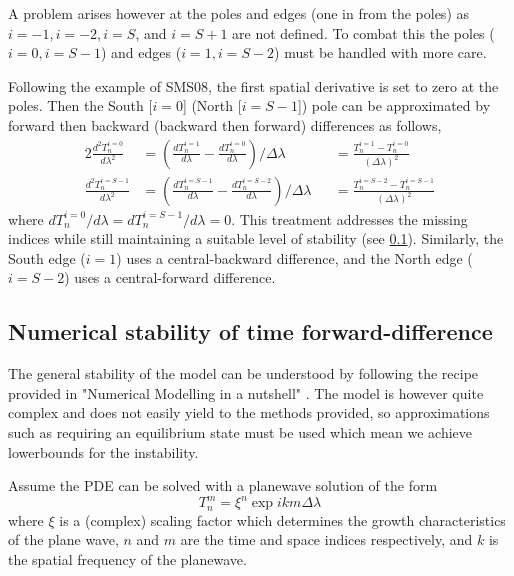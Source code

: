 \documentclass[12pt, onecolumn]{revtex4-2}    %
\begin{document}
A problem arises however at the poles and edges (one in from the poles) as $i=-1, i=-2, i=S$, and $i=S+1$ are not defined.
To combat this the poles ($i=0, i=S-1$) and edges ($i=1, i=S-2$) must be handled with more care.

Following the example of SMS08, the first spatial derivative is set to zero at the poles.
Then the South [$i=0$] (North [$i=S-1$]) pole can be approximated by forward then backward (backward then forward) differences as follows,
\begin{alignat}{2}
    \frac{d^2 T^{i=0}_n}{d \lambda ^2}   & = \left(\frac{dT^{i=1}_n}{d\lambda} - \frac{dT^{i=0}_n}{d\lambda}\right) / \Delta\lambda     &  & = \frac{T^{i=1}_n - T^{i=0}_n}{(\Delta\lambda)^2}
    \label{eq:forward_backward}                                                                                                                                                                    \\
    \frac{d^2 T^{i=S-1}_n}{d \lambda ^2} & = \left(\frac{dT^{i=S-1}_n}{d\lambda} - \frac{dT^{i=S-2}_n}{d\lambda}\right) / \Delta\lambda &  & = \frac{T^{i=S-2}_n - T^{i=S-1}_n}{(\Delta\lambda)^2}
    \label{eq:backward_forward}
\end{alignat}
where $dT^{i=0}_n/d\lambda = dT^{i=S-1}_n/d\lambda = 0$.
This treatment addresses the missing indices while still maintaining a suitable level of stability (see \ref{sec:numerical_stability}).
Similarly, the South edge ($i=1$) uses a central-backward difference, and the North edge ($i=S-2$) uses a central-forward difference.

\subsection{Numerical stability of time forward-difference} \label{sec:numerical_stability}

The general stability of the model can be understood by following the recipe provided in "Numerical Modelling in a nutshell" \cite{NumericalModelling}.
The model is however quite complex and does not easily yield to the methods provided, so approximations such as requiring an equilibrium state must be used which mean we achieve lowerbounds for the instability.

Assume the PDE can be solved with a planewave solution of the form
\begin{equation} \label{eq:trial_plane_wave}
    T^m_n = \xi^n \exp{i k m \Delta\lambda}
\end{equation}
where $\xi$ is a (complex) scaling factor which determines the growth characteristics of the plane wave, $n$ and $m$ are the time and space indices respectively, and $k$ is the spatial frequency of the planewave.
\end{document}
